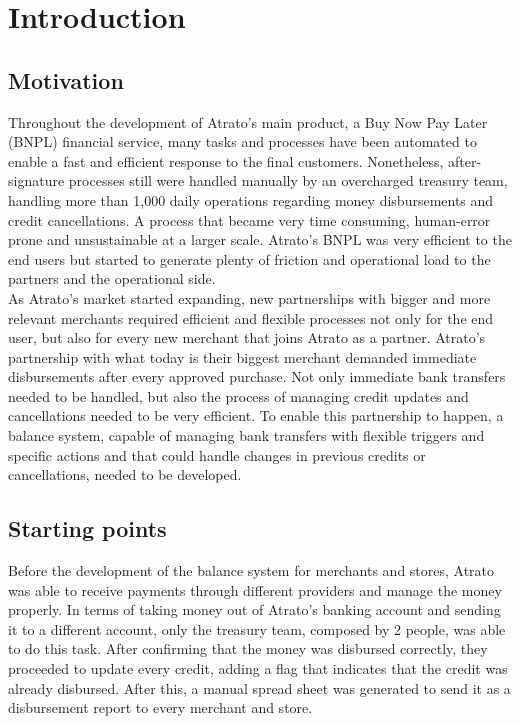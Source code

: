 \chapter{Introduction}


\section{Motivation}

Throughout the development of Atrato’s main product, a Buy Now Pay Later (BNPL) financial service, many tasks and processes have been automated to enable a fast and efficient response to the final customers. Nonetheless, after-signature processes still were handled manually by an overcharged treasury team, handling more than 1,000 daily operations regarding money disbursements and credit cancellations. A process that became very time consuming, human-error prone and unsustainable at a larger scale. Atrato’s BNPL was very efficient to the end users but started to generate plenty of friction and operational load to the partners and the operational side.\\

As Atrato’s market started expanding, new partnerships with bigger and more relevant merchants required efficient and flexible processes not only for the end user, but also for every new merchant that joins Atrato as a partner. Atrato’s partnership with what today is their biggest merchant demanded immediate disbursements after every approved purchase. Not only immediate bank transfers needed to be handled, but also the process of managing credit updates and cancellations needed to be very efficient. To enable this partnership to happen, a balance system, capable of managing bank transfers with flexible triggers and specific actions and that could handle changes in previous credits or cancellations, needed to be developed.


\section{Starting points}

Before the development of the balance system for merchants and stores, Atrato was able to receive payments through different providers and manage the money properly.  In terms of taking money out of Atrato’s banking account and sending it to a different account, only the treasury team, composed by 2 people, was able to do this task. After confirming that the money was disbursed correctly, they proceeded to update every credit, adding a flag that indicates that the credit was already disbursed. After this, a manual spread sheet was generated to send it as a disbursement report to every merchant and store.\\

